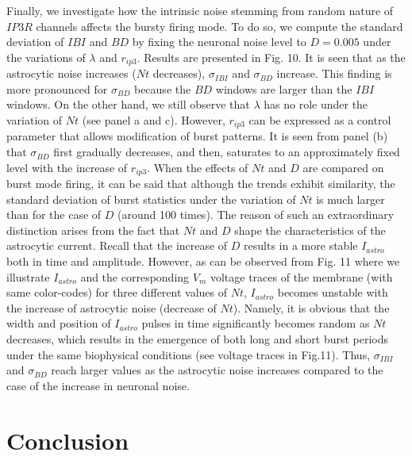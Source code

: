 \documentclass[%
 aip,
 amsmath,amssymb,
 reprint,%
]{revtex4-1}
\begin{document}
	
	Finally, we investigate how the intrinsic noise stemming from random nature of $IP3R$ channels affects the bursty firing mode. To do so, we compute the standard deviation of $IBI$ and $BD$ by fixing the neuronal noise level to $D=0.005$ under the variations of $\lambda$ and $r_{ip3}$. Results are presented in Fig. 10. It is seen that as the astrocytic noise increases ($Nt$ decreases), $\sigma_{IBI}$ and $\sigma_{BD}$ increase. This finding is more pronounced for $\sigma_{BD}$ because the $BD$ windows are larger than the $IBI$ windows. On the other hand, we still observe that $\lambda$ has no role under the variation of $Nt$ (see panel a and c). However, $r_{ip3}$ can be expressed as a control parameter that allows modification of burst patterns. It is seen from panel (b) that $\sigma_{BD}$ first gradually decreases, and then, saturates to an approximately fixed level with the increase of $r_{ip3}$. When the effects of $Nt$ and $D$ are compared on burst mode firing, it can be said that although the trends exhibit similarity, the standard deviation of burst statistics under the variation of $Nt$ is much larger than for the case of $D$ (around 100 times). The reason of such an extraordinary distinction arises from the fact that $Nt$ and $D$ shape the characteristics of the astrocytic current. Recall that the increase of $D$ results in a more stable $I_{astro}$ both in time and amplitude. However, as can be observed from Fig. 11 where we illustrate $I_{astro}$ and the corresponding $V_{m}$ voltage traces of the membrane (with same color-codes) for three different values of $Nt$, $I_{astro}$ becomes unstable with the increase of astrocytic noise (decrease of $Nt$). Namely, it is obvious that the width and position of $I_{astro}$ pulses in time significantly becomes random as $Nt$ decreases, which results in the emergence of both long and short burst periods under the same biophysical conditions (see voltage traces in Fig.11). Thus, $\sigma_{IBI}$ and $\sigma_{BD}$ reach larger values as the astrocytic noise increases compared to the case of the increase in neuronal noise.

	
	\section{Conclusion}
\end{document}
